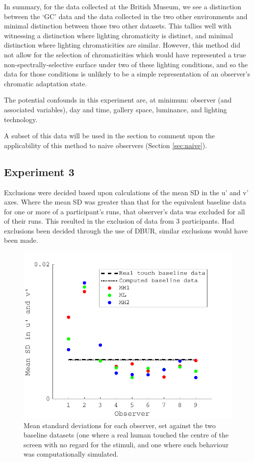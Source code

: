 In summary, for the data collected at the British Museum, we see a distinction between the `GC' data and the data collected in the two other environments and minimal distinction between those two other datasets. This tallies well with witnessing a distinction where lighting chromaticity is distinct, and minimal distinction where lighting chromaticities are similar. However, this method did not allow for the selection of chromaticities which would have represented a true non-spectrally-selective surface under two of these lighting conditions, and so the data for those conditions is unlikely to be a simple representation of an observer's chromatic adaptation state.

The potential confounds in this experiment are, at minimum: observer (and associated variables), day and time, gallery space, luminance, and lighting technology.

A subset of this data will be used in the  section to comment upon the applicability of this method to naive observers (Section \ref{sec:naive}).

\clearpage

\subsection{Experiment 3}

Exclusions were decided based upon calculations of the mean SD in the u' and v' axes. Where the mean SD was greater than that for the equivalent baseline data for one or more of a participant's runs, that observer's data was excluded for all of their runs. This resulted in the exclusion of data from 3 participants. Had exclusions been decided through the use of \gls{DBUR}, similar exclusions would have been made.

\begin{figure}[hbtp] 
\includegraphics[max width=\textwidth]{figs/tablet/exp3excl.pdf} 
\caption{Mean standard deviations for each observer, set against the two baseline datasets (one where a real human touched the centre of the screen with no regard for the stimuli, and one where such behaviour was computationally simulated.}
\label{fig:exp3excl}
\end{figure}


